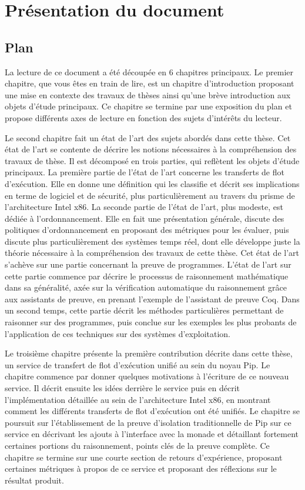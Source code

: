 \section{Présentation du document}

\subsection{Plan}

La lecture de ce document a été découpée en 6 chapitres principaux. Le premier chapitre, que vous êtes en train de lire, est un chapitre d'introduction proposant une mise en contexte des travaux de thèses ainsi qu'une brève introduction aux objets d'étude principaux. Ce chapitre se termine par une exposition du plan et propose différents axes de lecture en fonction des sujets d'intérêts du lecteur.

Le second chapitre fait un état de l'art des sujets abordés dans cette thèse. Cet état de l'art se contente de décrire les notions nécessaires à la compréhension des travaux de thèse. Il est décomposé en trois parties, qui reflètent les objets d'étude principaux. La première partie de l'état de l'art concerne les transferts de flot d'exécution. Elle en donne une définition qui les classifie et décrit ses implications en terme de logiciel et de sécurité, plus particulièrement au travers du prisme de l'architecture Intel x86. La seconde partie de l'état de l'art, plus modeste, est dédiée à l'ordonnancement. Elle en fait une présentation générale, discute des politiques d'ordonnancement en proposant des métriques pour les évaluer, puis discute plus particulièrement des systèmes temps réel, dont elle développe juste la théorie nécessaire à la compréhension des travaux de cette thèse. Cet état de l'art s'achève sur une partie concernant la preuve de programmes. L'état de l'art sur cette partie commence par décrire le processus de raisonnement mathématique dans sa généralité, axée sur la vérification automatique du raisonnement grâce aux assistants de preuve, en prenant l'exemple de l'assistant de preuve Coq. Dans un second temps, cette partie décrit les méthodes particulières permettant de raisonner sur des programmes, puis conclue sur les exemples les plus probants de l'application de ces techniques sur des systèmes d'exploitation.

Le troisième chapitre présente la première contribution décrite dans cette thèse, un service de transfert de flot d'exécution unifié au sein du noyau Pip. Le chapitre commence par donner quelques motivations à l'écriture de ce nouveau service. Il décrit ensuite les idées derrière le service puis en décrit l'implémentation détaillée au sein de l'architecture Intel x86, en montrant comment les différents transferts de flot d'exécution ont été unifiés. Le chapitre se poursuit sur l'établissement de la preuve d'isolation traditionnelle de Pip sur ce service en décrivant les ajouts à l'interface avec la monade et détaillant fortement certaines portions du raisonnement, points clés de la preuve complète. Ce chapitre se termine sur une courte section de retours d'expérience, proposant certaines métriques à propos de ce service et proposant des réflexions sur le résultat produit. 

